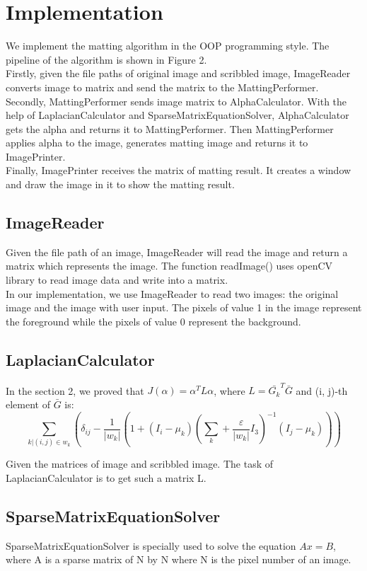 \documentclass[11pt,letterpaper]{article}
\begin{document}
\section{Implementation}
We implement the matting algorithm in the OOP programming style. The pipeline of the algorithm is shown in Figure 2. \\

Firstly, given the file paths of original image and scribbled image, ImageReader converts image to matrix and send the matrix to the MattingPerformer. \\

Secondly, MattingPerformer sends image matrix to AlphaCalculator. With the help of LaplacianCalculator and SparseMatrixEquationSolver, AlphaCalculator gets the alpha and returns it to MattingPerformer. Then MattingPerformer applies alpha to the image, generates matting image and returns it to ImagePrinter.\\

Finally, ImagePrinter receives the matrix of matting result. It creates a window and draw the image in it to show the matting result. 

\subsection{ImageReader}
Given the file path of an image, ImageReader will read the image and return a matrix which represents the image. The function readImage() uses openCV library to read image data and write into a matrix. \\

In our implementation, we use ImageReader to read two images: the original image and the image with user input. The pixels of value 1 in the image represent the foreground while the pixels of value 0 represent the background. 

\subsection{LaplacianCalculator}
In the section 2, we proved that $J(\alpha) = \alpha^T L \alpha$, where $L = \bar{G_k}^T\bar{G}$ and (i, j)-th element of $\bar{G}$ is:
$$\sum_{k|(i,j) \in w_k} (\delta_{ij} - \frac{1}{|w_k|}(1 + (I_i - \mu_k)(\sum_k + \frac{\varepsilon}{|w_k|}I_3)^{-1}(I_j - \mu_k)))$$

Given the matrices of image and scribbled image. The task of LaplacianCalculator is to get such a matrix L. 

\subsection{SparseMatrixEquationSolver}
SparseMatrixEquationSolver is specially used to solve the equation $Ax=B$, where A is a sparse matrix of N by N where N is the pixel number of an image. \\
\end{document}
